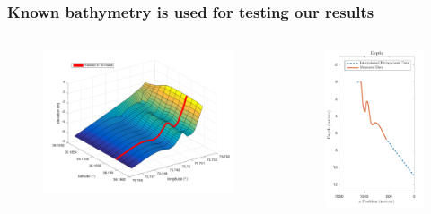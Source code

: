 \documentclass[7pt]{beamer}
\begin{document}
\begin{frame}
	\frametitle{Known bathymetry is used for testing our results}
		\begin{columns}
				\begin{figure}[H]
	 				\includegraphics[width=1.2\linewidth]{img/trueBath2D.png}
	 			\end{figure}
				\begin{figure}[h]
					\includegraphics[width=.70\linewidth]{img/DepthChart.png}
				\end{figure}
			\end{columns}
\end{frame}
\end{document}
